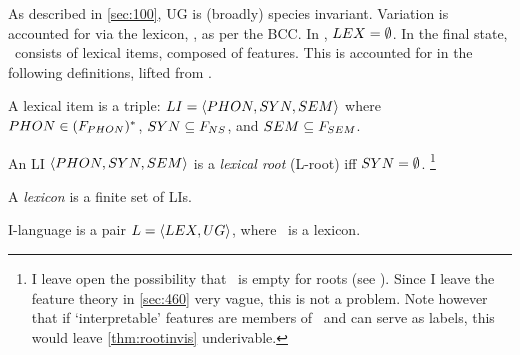 As described in \autoref{sec:100}, UG is (broadly) species invariant. Variation is accounted for via the lexicon, \LEX, as per the BCC. In \Szero, $LEX=\emptyset$. In the final state, \LEX\ consists of lexical items, composed of features. This is accounted for in the following definitions, lifted from \CS.

\begin{definition}
    A lexical item is a triple: $LI=\langle PHON,SYN,SEM \rangle$ where $PHON\in(F_{PHON})^*$, $SYN\subseteq F_{NS}$, and $SEM\subseteq F_{SEM}$.%
\end{definition}

\begin{definition}\label{def:lexroot}
    An LI $\langle PHON,SYN,SEM \rangle$ is a \textit{lexical root} (L-root) iff $SYN=\emptyset$.%
        \footnote{I leave open the possibility that \SEM\ is empty for roots (see ). Since I leave the feature theory in \autoref{sec:460} very vague, this is not a problem. Note however that if `interpretable' features are members of \Fsem\ and can serve as labels, this would leave \autoref{thm:rootinvis} underivable.}
\end{definition}

\begin{definition}
    A \textit{lexicon} is a finite set of LIs.
\end{definition}

\begin{definition}
    I-language is a pair $L = \langle LEX, UG \rangle$, where \LEX\ is a lexicon.
\end{definition}
